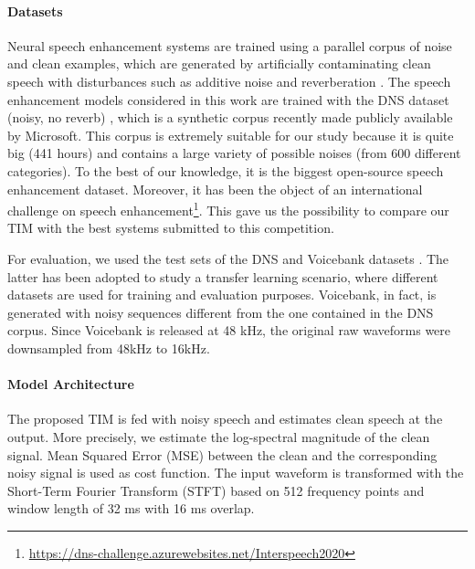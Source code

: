 \paragraph{Datasets} 
Neural speech enhancement systems are trained using a parallel corpus of noise and clean examples, which are generated by artificially contaminating clean speech with disturbances such as additive noise and reverberation \citep{speech_cont}. The speech enhancement models considered in this work are trained with the DNS dataset (noisy, no reverb) \citep{reddy2020interspeech}, which is a synthetic corpus recently made publicly available by Microsoft. This corpus is extremely suitable for our study because it is quite big (441 hours) and contains a large variety of possible noises (from 600 different categories). To the best of our knowledge, it is the biggest open-source speech enhancement dataset. Moreover, it has been the object of an international challenge on speech enhancement\footnote{\url{https://dns-challenge.azurewebsites.net/Interspeech2020}}. This gave us the possibility to compare our TIM with the best systems submitted to this competition. 

For evaluation, we used the test sets of the DNS and Voicebank datasets \citep{thiemann2013diverse}. The latter has been adopted to study a transfer learning scenario, where different datasets are used for training and evaluation purposes. Voicebank, in fact, is generated with noisy sequences different from the one contained in the DNS corpus. Since Voicebank is released at 48 kHz, the original raw waveforms were downsampled from 48kHz to 16kHz.

\paragraph{Model Architecture}
The proposed TIM is fed with noisy speech and estimates clean speech at the output. More precisely, we estimate the log-spectral magnitude of the clean signal. Mean Squared Error (MSE) between the clean and the corresponding noisy signal is used as cost function. 
The input waveform is transformed with the Short-Term Fourier Transform (STFT) based on 512 frequency points and window length of 32 ms with 16 ms overlap.

